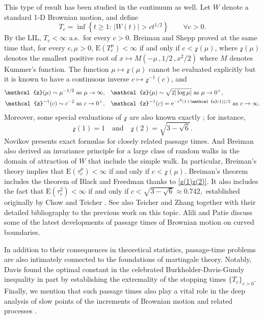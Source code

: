 \documentclass[reqno]{amsart}
\newcommand{\<}{\langle}
\renewcommand{\>}{\rangle}
\newcommand{\E}{\mathrm{E}}
\newcommand{\1}{\mathbb{1}}
\newcommand{\e}{{\rm e}}
\renewcommand{\ge}{\geqslant}
\theoremstyle{definition}
\numberwithin{equation}{section}
\begin{document}
This type of result has been studied in the continuum
as well. Let $W$ denote a standard
1-D Brownian motion, and define
\[
	T_c = \inf\left\{t\ge1:\, |W(t)| > c t^{1/2}\right\}
	\qquad\forall c>0.
\]
By the LIL, $T_c<\infty$ a.s.\ for every $c>0$.  
Breiman \cite{Breiman} and Shepp \cite{Shepp} proved 
at the same time that, for every $c,\mu>0$,
$\E(T_c^\mu)<\infty$ if and only if $c<\mathcal{z}(\mu)$,
where $\mathcal{z}(\mu)$ denotes the smallest positive root
of $x\mapsto M(-\mu\,,1/2\,, x^2/2)$ where $M$ denotes
Kummer's function. The function $\mu\mapsto\mathcal{z}(\mu)$ cannot be evaluated
explicitly but it is known to have a continuous inverse $c\mapsto\mathcal{z}^{-1}(c)$, and
\begin{equation}\label{z(mu)}\begin{split}
	\mathcal{z}(\mu)\sim \mu^{-1/2} \text{ as }\mu\to\infty,\quad&
		\mathcal{z}(\mu) \sim \sqrt{2|\log\mu|}\text{ as }\mu\to0^+,\\
	\mathcal{z}^{-1}(c) \sim c^{-2} \text{ as }c\to0^+,\quad&
		\mathcal{z}^{-1}(c) = \e^{-c^2(1+\mathcal{o}(1))/2}
		\text{ as }c\to\infty.
\end{split}\end{equation}
Moreover, some special evaluations of $\mathcal{z}$ are also known exactly
\cite{Breiman,Shepp}; for instance,
\begin{equation}\label{z(1)z(2)}\textstyle
	\mathcal{z}(1)=1
	\quad\text{and}\quad
	\mathcal{z}(2)= \sqrt{3-\sqrt 6}.
\end{equation}
Novikov \cite{Novikov} presents
exact formulas for closely related passage times. And
Breiman \cite{Breiman} also derived an invariance principle for a large
class of random walks in the domain of attraction of $W$ that include
the simple walk. In particular, Breiman's theory implies that
$\E(\tau_c^\mu)<\infty$ if and only if $c<\mathcal{z}(\mu).$
Breiman's theorem includes the theorem of Black and Freedman 
\cite{BlackwellFreedman} thanks to \eqref{z(1)z(2)}. It also includes
the fact that
$\E(\tau_c^2)<\infty$ if and only if $c<\sqrt{3-\sqrt 6}\approx 0.742,$
established originally by Chow and Teicher \cite{CT}.
See also Teicher and Zhang \cite{TeicherZhang} together with their
detailed bibliography to the previous work on this topic.
Alili and Patie \cite{AliliPatie} discuss some of the latest developments
of passage times of Brownian motion on curved boundaries.

In addition to their consequences in theoretical statistics, passage-time problems 
are also intimately connected to the foundations of 
martingale theory. Notably, Davis \cite{Davis76} found 
the optimal constant in the celebrated Burkholder-Davis-Gundy inequality in part by 
establishing the extremality of the stopping times $\{T_c\}_{c>0}$. Finally, we
mention that such passage
times also play a vital role in the deep
analysis of slow points of the increments of Brownian motion and 
related processes \cite{BassBurdzy96,Davis83,
	DavisPerkins85,GreenwoodPerkinsA,GreenwoodPerkinsB,
	Perkins83,Verzani95}.
\end{document}
